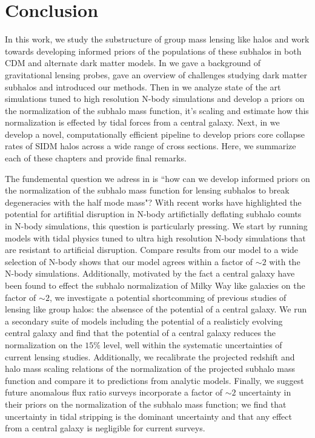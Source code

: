 \chapter{Conclusion}
In this work, we study the substructure of group mass lensing like halos and work towards developing informed priors of the populations of these subhalos in both CDM and alternate dark matter models.
In  we gave a background of gravitational lensing probes, gave an overview of challenges studying dark matter subhalos and introduced our methods. 
Then in  we analyze state of the art \gal simulations tuned to high resolution N-body simulations and develop a priors on the normalization of the subhalo mass function, it's scaling and estimate how this normalization is effected by tidal forces from a central galaxy. 
Next, in  we develop a novel, computationally efficient pipeline to develop priors core collapse rates of SIDM halos across a wide range of cross sections.
Here, we summarize each of these chapters and provide final remarks.

The fundemental question we adress in  is ``how can we develop informed priors on the normalization of the subhalo mass function for lensing subhalos to break degeneracies with the half mode mass"?
With recent works have highlighted the potential for artifitial disruption in N-body artifictially deflating subhalo counts in N-body simulations, this question is particularly pressing.
We start by running \gal models with tidal physics tuned to ultra high resolution N-body simulations that are resistant to artificial disruption. 
Compare results from our \gal model to a wide selection of N-body shows that our model agrees within a factor of $\sim 2 $ with the N-body simulations.
Additionally, motivated by the fact a central galaxy have been found to effect the subhalo normalization of Milky Way like galaxies on the factor of $\sim 2$, we investigate a potential shortcomming of previous studies of lensing like group halos: the absensce of the potential of a central galaxy.
We run a secondary suite of \gal models including the potential of a realisticly evolving central galaxy and find that the potential of a central galaxy reduces the normalization on the $15\%$ level, well within the systematic uncertainties of current lensing studies.
Additionally, we recalibrate the projected redshift and halo mass scaling relations of the normalization of the projected subhalo mass function and compare it to predictions from analytic models.
Finally, we suggest future anomalous flux ratio surveys incorporate a factor of $\sim 2$ uncertainty in their priors on the normalization of the subhalo mass function; we find that uncertainty in tidal stripping is the dominant uncertainty and that any effect from a central galaxy is negligible for current surveys.

